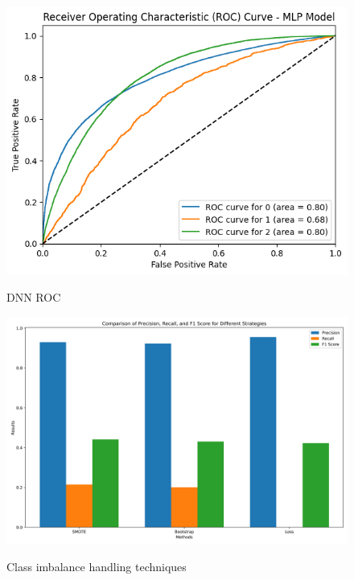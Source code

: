 \documentclass[conference]{IEEEtran}
\begin{document}
    \begin{figure}[h]
        \centering
        \includegraphics[scale=0.39]{ffnnROC.png}
        \label{fig:ffnnROC}
        \caption{DNN ROC}
    \end{figure}

    \begin{figure}[h]
        \centering
        \includegraphics[scale = 0.30]{stratcomparison_high_dpi.png}
        \label{fig:stratcomparison}
        \caption{Class imbalance handling techniques}
    \end{figure}

        
\end{document}
